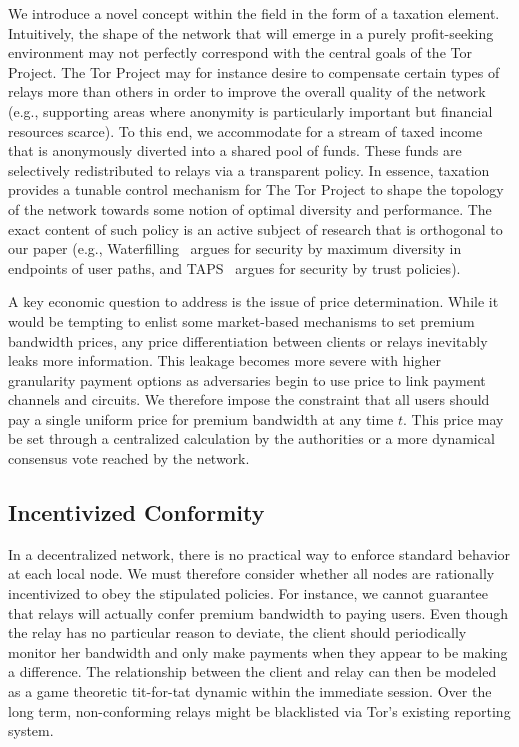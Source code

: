We introduce a novel concept within the field in the form of a taxation
element. Intuitively, the shape of the network that will emerge in a purely
profit-seeking environment may not perfectly correspond with the central goals
of the Tor Project. The Tor Project may for instance desire to compensate
certain types of relays more than others in order to improve the overall quality
of the network (e.g., supporting areas where anonymity is particularly important
but financial resources scarce). To this end, we accommodate for a stream of
taxed income that is anonymously diverted into a shared pool of funds. These
funds are selectively redistributed to relays via a transparent policy.  In
essence, taxation provides a tunable control mechanism for The Tor Project to
shape the topology of the network towards some notion of optimal diversity and
performance. The exact content of such policy is an active subject of research
that is orthogonal to our paper (e.g., Waterfilling~\cite{waterfilling-pets2017}
argues for security by maximum diversity in endpoints of user paths, and
TAPS~\cite{taps-ndss2017} argues for security by trust policies).

A key economic question to address is the issue of price determination. While it
would be tempting to enlist some market-based mechanisms to set premium
bandwidth prices, any price differentiation between clients or relays inevitably
leaks more information. This leakage becomes more severe with higher granularity
payment options as adversaries begin to use price to link payment channels and
circuits. We therefore impose the constraint that all users should pay a single
uniform price for premium bandwidth at any time $t$. This price may be set
through a centralized calculation by the authorities or a more dynamical
consensus vote reached by the network.
\subsection{Incentivized Conformity} In a decentralized network, there is no
practical way to enforce standard behavior at each local node. We must therefore
consider whether all nodes are rationally incentivized to obey the stipulated
policies. For instance, we cannot guarantee that relays will actually confer
premium bandwidth to paying users. Even though the relay has no particular
reason to deviate, the client should periodically monitor her bandwidth and only
make payments when they appear to be making a difference. The relationship
between the client and relay can then be modeled as a game theoretic tit-for-tat
dynamic within the immediate session. Over the long term, non-conforming relays
might be blacklisted via Tor's existing reporting system.

